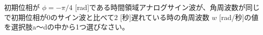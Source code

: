 初期位相が $\phi=-\pi/4$ [rad]である時間領域アナログサイン波が、角周波数が同じで初期位相が$0$のサイン波と比べて$2$ [秒]遅れている時の角周波数 $w$ [rad/秒]の値を選択肢a〜dの中から1つ選びなさい。
